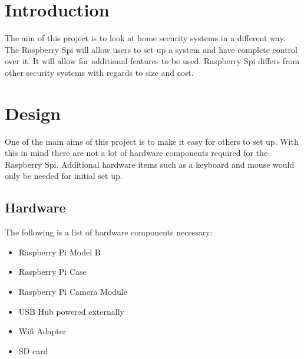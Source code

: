 \documentclass[]{report}   %
\begin{document}



\tableofcontents
\chapter {Introduction}
\label {ch:intro} 
The aim of this project is to look at home security systems in a different way. The Raspberry Spi will allow users to set up a system and have complete control over it. It will allow for additional features to be used. 
Raspberry Spi differs from other security systems with regards to size and cost. 
% 
% 
\chapter {Design}
\label {ch:design}
	One of the main aims of this project is to make it easy for others to set up. With this in mind there are not a lot of hardware components required for the Raspberry Spi. Additional hardware items such as a keyboard and mouse would only be needed for initial set up. \\
	
\section {Hardware}	
\label {sec:hardware}

The following is a list of hardware components necessary:
\begin {itemize}
  \item Raspberry Pi Model B
  \item Raspberry Pi Case
  \item Raspberry Pi Camera Module
  \item USB Hub powered externally
  \item Wifi Adapter
  \item SD card
\end {itemize}
\end{document}

